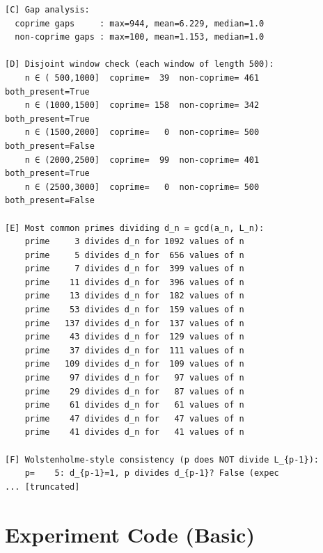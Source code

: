\documentclass[11pt]{article}
\begin{document}
\begin{lstlisting}
[C] Gap analysis:
  coprime gaps     : max=944, mean=6.229, median=1.0
  non-coprime gaps : max=100, mean=1.153, median=1.0

[D] Disjoint window check (each window of length 500):
    n ∈ ( 500,1000]  coprime=  39  non-coprime= 461   both_present=True
    n ∈ (1000,1500]  coprime= 158  non-coprime= 342   both_present=True
    n ∈ (1500,2000]  coprime=   0  non-coprime= 500   both_present=False
    n ∈ (2000,2500]  coprime=  99  non-coprime= 401   both_present=True
    n ∈ (2500,3000]  coprime=   0  non-coprime= 500   both_present=False

[E] Most common primes dividing d_n = gcd(a_n, L_n):
    prime     3 divides d_n for 1092 values of n
    prime     5 divides d_n for  656 values of n
    prime     7 divides d_n for  399 values of n
    prime    11 divides d_n for  396 values of n
    prime    13 divides d_n for  182 values of n
    prime    53 divides d_n for  159 values of n
    prime   137 divides d_n for  137 values of n
    prime    43 divides d_n for  129 values of n
    prime    37 divides d_n for  111 values of n
    prime   109 divides d_n for  109 values of n
    prime    97 divides d_n for   97 values of n
    prime    29 divides d_n for   87 values of n
    prime    61 divides d_n for   61 values of n
    prime    47 divides d_n for   47 values of n
    prime    41 divides d_n for   41 values of n

[F] Wolstenholme-style consistency (p does NOT divide L_{p-1}):
    p=    5: d_{p-1}=1, p divides d_{p-1}? False (expec
... [truncated]
\end{lstlisting}


\section{Experiment Code (Basic)}
\end{document}
